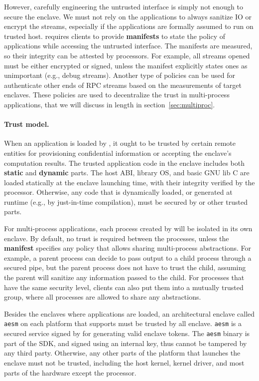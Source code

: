 However, carefully engineering the untrusted interface is simply not enough
to secure the enclave.
We must not rely on the applications to always
sanitize IO or encrypt the streams,
especially if the applications are formally assumed to run on trusted host.
\sysname{} requires clients to provide {\bf manifests} to state
the policy of applications while accessing the untrusted interface.
The manifests are measured, so their integrity can be attested by processors.
For example, all streams opened must be either encrypted or signed,
unless the manifest explicitly states ones as unimportant
(e.g., debug streams).
Another type of policies can be used for authenticate other ends of RPC streams
based on the measurements of target enclaves.
These policies are used to decentralize the trust in multi-process applications,
that we will discuss in length in section~\ref{sec:multiproc}.

\paragraph{Trust model.}
When an application is loaded by \sysname{}, it ought to be trusted by
certain remote entities
for provisioning confidential information or
accepting the enclave's computation results.
The trusted application code in the enclave includes both
{\bf static} and {\bf dynamic} parts.
The host ABI, library OS, and basic GNU lib C are loaded statically
at the enclave launching time,
with their integrity verified by the processor.
Otherwise, any code that is dynamically loaded, or generated at runtime
(e.g., by just-in-time compilation),
must be secured by \sysname{} or other trusted parts.

For multi-process applications, each process created by \sysname{}
will be isolated in its own enclave.
By default, no trust is required between the processes,
unless the {\bf manifest} specifies any policy
that allows sharing multi-process abstractions.
For example, a parent process can decide to pass output to a child process
through a secured pipe,
but the parent process does not have to trust the child, assuming
the parent will sanitize any information passed to the child.
For processes that have the same security level,
clients can also put them into a mutually trusted group,
where all processes are allowed to share any abstractions.

Besides the enclaves where applications are loaded,
an architectural enclave called {\tt aesm} on each platform that supports \sgx{}
must be trusted by all enclave.
{\tt aesm} is a secured service signed by \intel{} for generating
valid enclave tokens.
The {\tt aesm} binary is part of the \sgx{} SDK,
and signed using an \intel{} internal key, thus cannot be
tampered by any third party.
Otherwise, any other parts of the platform that launches the enclave
must not be trusted, including the host kernel,
\sgx{} kernel driver, and most parts of the hardware except the processor.

